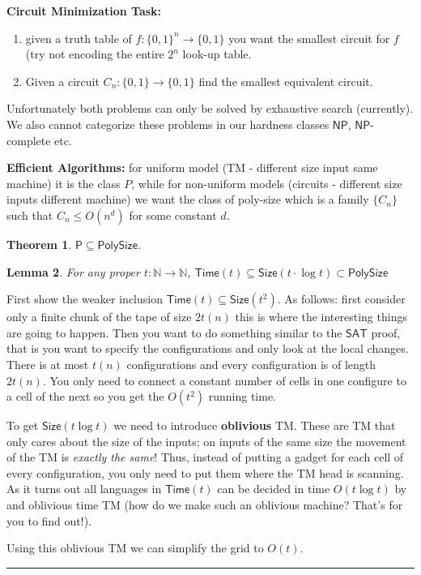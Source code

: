 \documentclass[twoside]{article}
\newcounter{lecnum}
\newtheorem{theorem}{Theorem}[lecnum]
\newtheorem{lemma}[theorem]{Lemma}
\newenvironment{proof}{{\bf Proof:}}{\hfill\rule{2mm}{2mm}}
\def\N{\mathbb{N}}
\def\P{\mathsf{P}}
\def\NP{\mathsf{NP}}
\begin{document}
\textbf{Circuit Minimization Task:} 

\begin{enumerate}
\item given a truth table of $f: \{0,1\}^n \rightarrow \{0,1\}$ you want the smallest circuit for $f$ (try not encoding the entire $2^n$ look-up table.
\item Given a circuit $C_n: \{0,1\} \rightarrow \{0,1\}$ find the smallest equivalent circuit.
\end{enumerate}
Unfortunately both problems can only be solved by exhaustive search (currently). We also cannot categorize these problems in our hardness classes $\NP$, $\NP$-complete etc.

\textbf{Efficient Algorithms:} for uniform model (TM - different size input same machine) it is the class $P$, while for non-uniform models (circuits - different size inputs different machine) we want the class of poly-size which is a family $\{C_n\}$ such that $C_n \leq O(n^d)$ for some constant $d$. 

\begin{theorem}
$\P \subseteq \mathsf{PolySize}$.
\end{theorem}
\begin{lemma}
For any proper $t: \N \rightarrow \N$, $\mathsf{Time}(t) \subseteq \mathsf{Size}(t\cdot \log t) \subset \mathsf{PolySize}$
\end{lemma}
\begin{proof}
First show the weaker inclusion $\mathsf{Time}(t) \subseteq \mathsf{Size}(t^2)$. As follows: first consider only a finite chunk of the tape of size $2t(n)$ this is where the interesting things are going to happen. Then you want to do something similar to the $\mathsf{SAT}$ proof, that is you want to specify the configurations and only look at the local changes. There is at most $t(n)$ configurations and every configuration is of length $2t(n)$. You only need to connect a constant number of cells in one configure to a cell of the next so you get the $O(t^2)$ running time. 

To get $\mathsf{Size}(t\log t)$ we need to introduce \textbf{oblivious} TM. These are TM that only cares about the size of the inputs; on inputs of the same size the movement of the TM is \emph{exactly the same}! Thus, instead of putting a gadget for each cell of every configuration, you only need to put them where the TM head is scanning. As it turns out all languages in $\mathsf{Time}(t)$ can be decided in time $O(t \log t)$ by and oblivious time TM (how do we make such an oblivious machine? That's for you to find out!).

Using this oblivious TM we can simplify the grid to $O(t)$. 
\end{proof}
\end{document}
